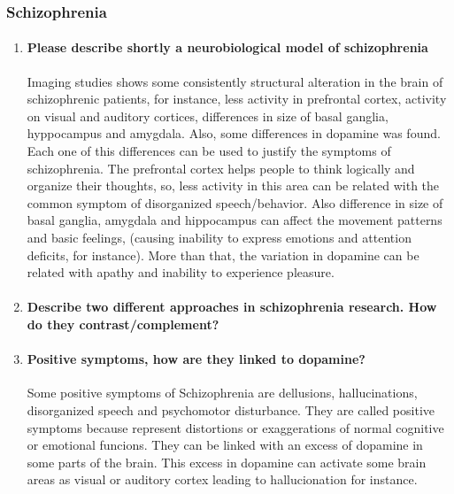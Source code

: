 \documentclass[12pt,article,oneside,a4paper]{memoir}
\begin{document}
\subsubsection{Schizophrenia}
\begin{enumerate}
\item \paragraph{Please describe shortly a neurobiological model of
schizophrenia}
Imaging studies shows some consistently structural alteration in the brain of
schizophrenic patients, for instance, less activity in prefrontal cortex,
activity on visual and auditory cortices, differences in size of basal ganglia,
hyppocampus and amygdala. Also, some differences in dopamine was found.
Each one of this differences can be used to justify the symptoms of
schizophrenia.
The prefrontal cortex helps people to think logically and organize their
thoughts, so, less activity in this area can be related with the common symptom
of disorganized speech/behavior. Also difference in  size of basal ganglia,
amygdala and hippocampus can affect the movement patterns and basic feelings,
(causing inability to express emotions and attention deficits, for instance).
More than that, the variation in dopamine can be related with apathy and
inability to experience pleasure.

\item \paragraph{Describe two different approaches in schizophrenia research.
How do they contrast/complement?}

\item \paragraph{Positive symptoms, how are they linked to dopamine?}
Some positive symptoms of Schizophrenia are dellusions, hallucinations,
disorganized speech and psychomotor disturbance. They are called positive
symptoms because represent distortions or exaggerations of normal cognitive or
emotional funcions. They can be linked with an excess of dopamine in some parts
of the brain. This excess in dopamine can activate some brain areas as visual
or auditory cortex leading to hallucionation for instance.


\end{enumerate}
\end{document}
